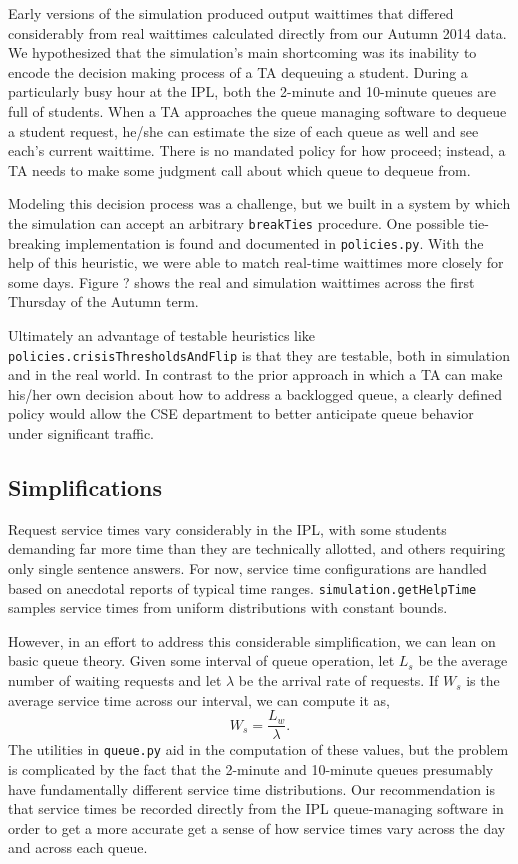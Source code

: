 \documentclass{article}
\begin{document}
\begin{multicols}{2}
Early versions of the simulation produced output waittimes that differed considerably from real waittimes calculated directly from our Autumn 2014 data. We hypothesized that the simulation's main shortcoming was its inability to encode the decision making process of a TA dequeuing a student. During a particularly busy hour at the IPL, both the 2-minute and 10-minute queues are full of students. When a TA approaches the queue managing software to dequeue a student request, he/she can estimate the size of each queue as well and see each's current waittime. There is no mandated policy for how proceed; instead, a TA needs to make some judgment call about which queue to dequeue from.

Modeling this decision process was a challenge, but we built in a system by which the simulation can accept an arbitrary \texttt{breakTies} procedure. One possible tie-breaking implementation is found and documented in \texttt{policies.py}. With the help of this heuristic, we were able to match real-time waittimes more closely for some days. Figure ? shows the real and simulation waittimes across the first Thursday of the Autumn term. 

Ultimately an advantage of testable heuristics like \texttt{policies.crisisThresholdsAndFlip} is that they are testable, both in simulation and in the real world. In contrast to the prior approach in which a TA can make his/her own decision about how to address a backlogged queue, a clearly defined policy would allow the CSE department to better anticipate queue behavior under significant traffic.

\subsection*{Simplifications}

Request service times vary considerably in the IPL, with some students demanding far more time than they are technically allotted, and others requiring only single sentence answers. For now, service time configurations are handled based on anecdotal reports of typical time ranges. \texttt{simulation.getHelpTime} samples service times from uniform distributions with constant bounds.

However, in an effort to address this considerable simplification, we can lean on basic queue theory. Given some interval of queue operation, let $L_s$ be the average number of waiting requests and let $\lambda$ be the arrival rate of requests. If $W_s$ is the average service time across our interval, we can compute it as,
\begin{equation}
W_s = \frac{L_w}{\lambda}.
\end{equation}
The utilities in \texttt{queue.py} aid in the computation of these values, but the problem is complicated by the fact that the 2-minute and 10-minute queues presumably have fundamentally different service time distributions. Our recommendation is that service times be recorded directly from the IPL queue-managing software in order to get a more accurate get a sense of how service times vary across the day and across each queue.


\end{multicols}
\end{document}
